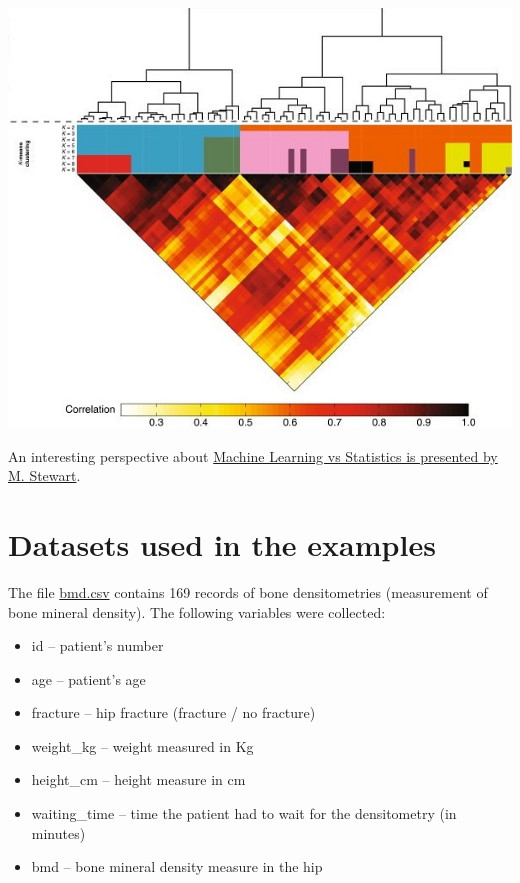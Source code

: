 \documentclass[
]{book}
\providecommand{\tightlist}{%
  \setlength{\itemsep}{0pt}\setlength{\parskip}{0pt}}
\begin{document}
\begin{center}\includegraphics[width=1\linewidth]{pattern} \end{center}

An interesting perspective about \href{https://towardsdatascience.com/the-actual-difference-between-statistics-and-machine-learning-64b49f07ea3}{Machine Learning vs Statistics is presented
by M. Stewart}.

\section*{Datasets used in the examples}\label{datasets-used-in-the-examples}

The file \href{https://www.dropbox.com/s/7wjsfdaf0wt2kg2/bmd.csv?dl=1}{bmd.csv}
contains 169 records of bone densitometries (measurement of
bone mineral density). The following variables were collected:

\begin{itemize}
\tightlist
\item
  id -- patient's number
\item
  age -- patient's age
\item
  fracture -- hip fracture (fracture / no fracture)
\item
  weight\_kg -- weight measured in Kg
\item
  height\_cm -- height measure in cm
\item
  waiting\_time -- time the patient had to wait for the densitometry (in minutes)
\item
  bmd -- bone mineral density measure in the hip
\end{itemize}
\end{document}
